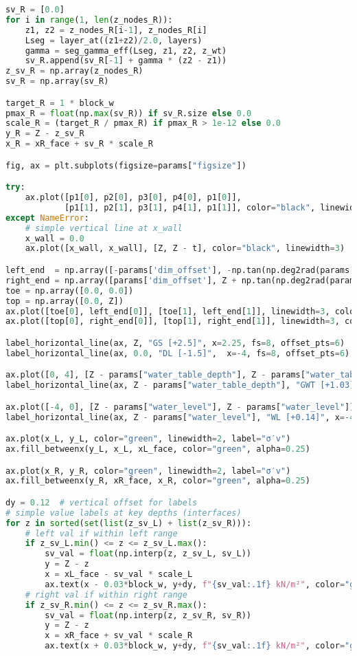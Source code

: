 \begin{lstlisting}[language=Python]
sv_R = [0.0]
for i in range(1, len(z_nodes_R)):
    z1, z2 = z_nodes_R[i-1], z_nodes_R[i]
    Lseg = layer_at((z1+z2)/2.0, layers)
    gamma = seg_gamma_eff(Lseg, z1, z2, z_wt)
    sv_R.append(sv_R[-1] + gamma * (z2 - z1))
z_sv_R = np.array(z_nodes_R)
sv_R = np.array(sv_R)

target_R = 1 * block_w
pmax_R = float(np.max(sv_R)) if sv_R.size else 0.0
scale_R = (target_R / pmax_R) if pmax_R > 1e-12 else 0.0
y_R = Z - z_sv_R
x_R = xR_face + sv_R * scale_R

fig, ax = plt.subplots(figsize=params["figsize"])

try:
    ax.plot([p1[0], p2[0], p3[0], p4[0], p1[0]],
            [p1[1], p2[1], p3[1], p4[1], p1[1]], color="black", linewidth=3)
except NameError:
    # simple vertical line at x_wall
    x_wall = 0.0
    ax.plot([x_wall, x_wall], [Z, Z - t], color="black", linewidth=3)

left_end  = np.array([-params['dim_offset'], -np.tan(np.deg2rad(params['beta_left_deg'])) * params['dim_offset']])
right_end = np.array([params['dim_offset'], Z + np.tan(np.deg2rad(params['beta_right_deg'])) * params['dim_offset']])
toe = np.array([0.0, 0.0])
top = np.array([0.0, Z])
ax.plot([toe[0], left_end[0]], [toe[1], left_end[1]], linewidth=3, color="black")
ax.plot([top[0], right_end[0]], [top[1], right_end[1]], linewidth=3, color="black")

label_horizontal_line(ax, Z, "GS [+2.5]", x=2.25, fs=8, offset_pts=6)
label_horizontal_line(ax, 0.0, "DL [-1.5]",  x=-4, fs=8, offset_pts=6)

ax.plot([0, 4], [Z - params["water_table_depth"], Z - params["water_table_depth"]], linestyle="--", linewidth=1.5, color="black")
label_horizontal_line(ax, Z - params["water_table_depth"], "GWT [+1.03]", x=2.25, fs=8, offset_pts=6)

ax.plot([-4, 0], [Z - params["water_level"], Z - params["water_level"]], linestyle="--", linewidth=1.5, color="black")
label_horizontal_line(ax, Z - params["water_level"], "WL [+0.14]", x=-4, fs=8, offset_pts=6)

ax.plot(x_L, y_L, color="green", linewidth=2, label="σ′v")
ax.fill_betweenx(y_L, x_L, xL_face, color="green", alpha=0.25)

ax.plot(x_R, y_R, color="green", linewidth=2, label="σ′v")
ax.fill_betweenx(y_R, xR_face, x_R, color="green", alpha=0.25)

dy = 0.12  # vertical offset for labels
# simple value labels at key depths (interfaces)
for z in sorted(set(list(z_sv_L) + list(z_sv_R))):
    # left val if within left range
    if z_sv_L.min() <= z <= z_sv_L.max():
        sv_val = float(np.interp(z, z_sv_L, sv_L))
        y = Z - z
        x = xL_face - sv_val * scale_L
        ax.text(x - 0.03*block_w, y+dy, f"{sv_val:.1f} kN/m²", color="green", fontsize=8, ha="right", va="center")
    # right val if within right range
    if z_sv_R.min() <= z <= z_sv_R.max():
        sv_val = float(np.interp(z, z_sv_R, sv_R))
        y = Z - z
        x = xR_face + sv_val * scale_R
        ax.text(x + 0.03*block_w, y+dy, f"{sv_val:.1f} kN/m²", color="green", fontsize=8, ha="left", va="center")


\end{lstlisting}
